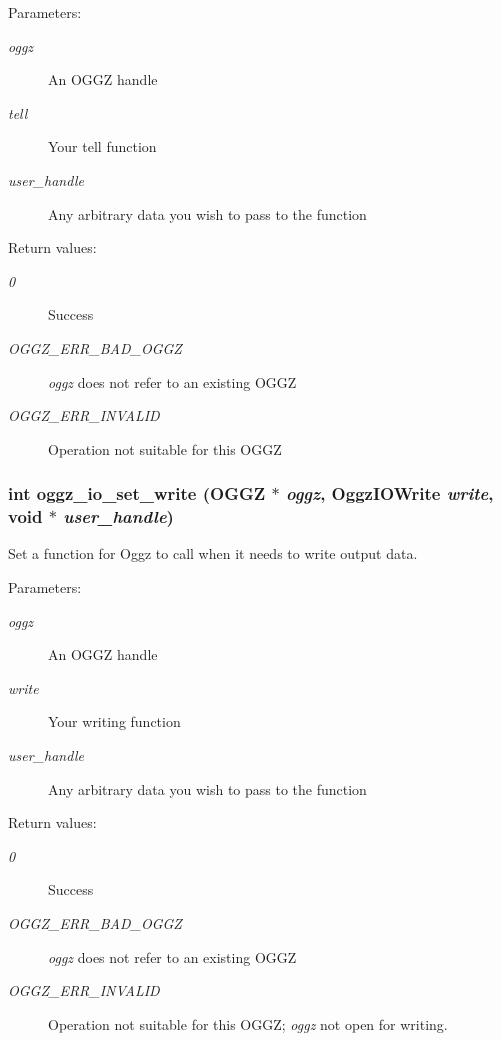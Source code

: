 \begin{Desc}
\item[Parameters:]
\begin{description}
\item[{\em oggz}]An OGGZ handle \item[{\em tell}]Your tell function \item[{\em user\_\-handle}]Any arbitrary data you wish to pass to the function \end{description}
\end{Desc}
\begin{Desc}
\item[Return values:]
\begin{description}
\item[{\em 0}]Success \item[{\em OGGZ\_\-ERR\_\-BAD\_\-OGGZ}]{\em oggz\/} does not refer to an existing OGGZ \item[{\em OGGZ\_\-ERR\_\-INVALID}]Operation not suitable for this OGGZ \end{description}
\end{Desc}
\subsubsection{\setlength{\rightskip}{0pt plus 5cm}int oggz\_\-io\_\-set\_\-write ({\bf OGGZ} $\ast$ {\em oggz}, {\bf Oggz\-IOWrite} {\em write}, void $\ast$ {\em user\_\-handle})}\label{oggz__io_8h_a7}


Set a function for Oggz to call when it needs to write output data. 

\begin{Desc}
\item[Parameters:]
\begin{description}
\item[{\em oggz}]An OGGZ handle \item[{\em write}]Your writing function \item[{\em user\_\-handle}]Any arbitrary data you wish to pass to the function \end{description}
\end{Desc}
\begin{Desc}
\item[Return values:]
\begin{description}
\item[{\em 0}]Success \item[{\em OGGZ\_\-ERR\_\-BAD\_\-OGGZ}]{\em oggz\/} does not refer to an existing OGGZ \item[{\em OGGZ\_\-ERR\_\-INVALID}]Operation not suitable for this OGGZ; {\em oggz\/} not open for writing. \end{description}
\end{Desc}
